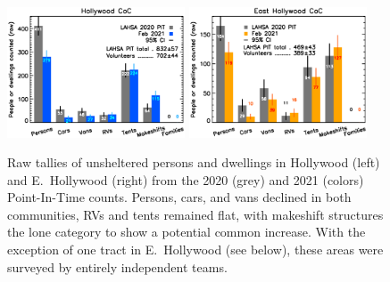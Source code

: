 \documentclass[11pt]{article}
\begin{document}
\begin{figure}[h]
	\centering
	\includegraphics[width = 0.47\textwidth, trim = 1cm 0cm 0cm 0cm]{Hwood2021Bars}
	\includegraphics[width = 0.47\textwidth, trim = 1cm 0cm 0cm 0cm]{Eho2021Bars}
	\caption{Raw tallies of unsheltered persons and dwellings in Hollywood (left) and E.~Hollywood
			(right) from the 2020 (grey) and 2021 (colors) Point-In-Time counts. Persons, cars, 
			and vans declined in both communities, RVs and tents remained flat, with makeshift 
			structures the lone category to show a potential common increase. 
			With the exception of one tract in E.\ Hollywood (see below), these areas were 
			surveyed by entirely independent teams.}
	\label{fig:rawCounts}
\end{figure}
\end{document}
